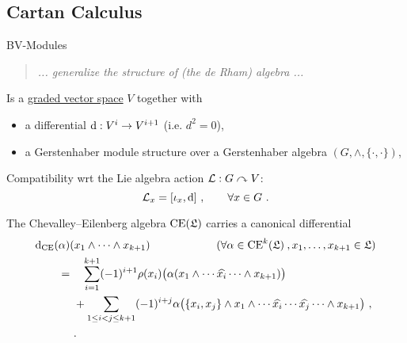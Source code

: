 \documentclass[beamer,10pt]{standalone}
\begin{document}
\subsection{Cartan Calculus}

\begin{frame}{BV-Modules}
  \begin{quote}
    \centering
    \emph{... generalize the structure of (the de Rham) algebra ...}
  \end{quote}
  \begin{defblock}
    Is a \underline{graded vector space} $V$ together with
    \begin{itemize}[label=$\triangleright$]
      \item a differential $\mathop{}\!\mathrm{d}: V^i \to V^{i+1}$ (i.e. $d^2=0$),
      \item a Gerstenhaber module structure over a Gerstenhaber algebra $(G, \wedge, \lbrace\cdot,\cdot\rbrace)$,
    \end{itemize}
    Compatibility wrt the Lie algebra action $\mathcal{L}:G\curvearrowright V$: 
    $$
      \mathcal{L}_x = [\iota_x, \mathop{}\!\mathrm{d}]~, \qquad \forall x \in G~.
    $$
  \end{defblock}
  \vfill\pause

    \begin{exblock}
    The Chevalley--Eilenberg algebra  $\mathrm{CE}(\mathfrak{L})$
    carries a canonical differential
\begin{align*}
	\mathop{}\!\mathrm{d}_{\mathrm{CE}}(\alpha)&(x_1 \wedge \dotsb \wedge x_{k+1})
  \qquad\qquad\qquad {\tiny(
  \forall \alpha \in \mathrm{CE}^k(\mathfrak{L})~, x_1, \dotsc, x_{k+1} \in \mathfrak{L})}
  \\
  =&~\phantom{+} \sum_{i=1}^{k+1} (-1)^{i+1} \rho(x_i)\big(\alpha(x_1 \wedge \dotsb \widehat{x_i} \dotsb \wedge x_{k+1})\big) \\
	&~+ \sum_{1 \leq i < j \leq k+1} (-1)^{i+j} \alpha\big(\lbrace x_i, x_j\rbrace \wedge x_1 \wedge \dotsb \widehat{x_i} \dotsb \widehat{x_j} \dotsb \wedge x_{k+1}\big)~,\\
  &~.
\end{align*}
  \end{exblock}

\end{frame}
\end{document}

